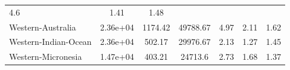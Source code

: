 \begin{table}[H]
{\begin{tabular}{lcccccc}
            4.6                                        & 1.41     & 1.48
            \\
            Western-Australia                          & 2.36e+04 & 1174.42 &
            49788.67                                   &
            4.97                                       & 2.11     & 1.62
            \\
            Western-Indian-Ocean                       & 2.36e+04 & 502.17  &
            29976.67                                   &
            2.13                                       & 1.27     & 1.45
            \\
            Western-Micronesia                         & 1.47e+04 & 403.21  &
            24713.6                                    &
            2.73                                       & 1.68     & 1.37
            \\
            \hline
        \end{tabular}%
    }
\end{table}

